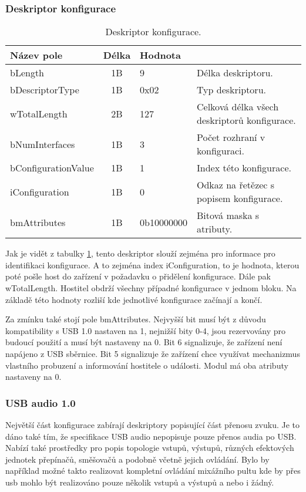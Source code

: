 \subsubsection{Deskriptor konfigurace}
\begin{table}
\begin{center}
\begin{tabular}{|l|c|l|l|}
\hline 
Název pole & Délka & Hodnota &  \\ 
\hline
bLength & 1B & 9 & Délka deskriptoru.\\
\hline
bDescriptorType & 1B & 0x02 & Typ deskriptoru. \\
\hline
wTotalLength & 2B & 127 & Celková délka všech deskriptorů konfigurace.\\
\hline
bNumInterfaces & 1B & 3 & Počet rozhraní v konfiguraci.\\
\hline
bConfigurationValue & 1B & 1 & Index této konfigurace.\\
\hline
iConfiguration & 1B & 0 & Odkaz na řetězec s popisem konfigurace.\\
\hline
bmAttributes & 1B & 0b10000000 & Bitová maska s atributy.\\
\hline
\end{tabular} 
\end{center}
\caption{Deskriptor konfigurace.}
\label{tab:usb-conf-desc} 
\end{table}
\FloatBarrier

Jak je vidět z tabulky \ref{tab:usb-conf-desc}, tento deskriptor slouží zejména pro informace pro identifikaci konfigurace. A to zejména index iConfiguration, to je hodnota, kterou poté pošle host do zařízení v požadavku o přidělení konfigurace. Dále pak wTotalLength. Hostitel obdrží všechny případné konfigurace v jednom bloku. Na základě této hodnoty rozliší kde jednotlivé konfigurace začínají a končí.

Za zmínku také stojí pole bmAttributes. Nejvyšší bit musí být z důvodu kompatibility s USB 1.0 nastaven na 1, nejnižší bity 0-4, jsou rezervovány pro budoucí použití a musí být nastaveny na 0. Bit 6 signalizuje, že zařízení není napájeno z USB sběrnice. Bit 5 signalizuje že zařízení chce využívat mechanizmus vlastního probuzení a informování hostitele o události. Modul má oba atributy nastaveny na 0.


\subsubsection{USB audio 1.0}
Největší část konfigurace zabírají deskriptory popisující část přenosu zvuku. Je to dáno také tím, že specifikace USB audio \cite{usb-audio} nepopisuje pouze přenos audia po USB. Nabízí také prostředky pro popis topologie vstupů, výstupů, různých efektových jednotek přepínačů, směšovačů a podobně včetně jejich ovládání. Bylo by například možné takto realizovat kompletní ovládání mixážního pultu kde by přes usb mohlo být realizováno pouze několik vstupů a výstupů a nebo i žádný.

